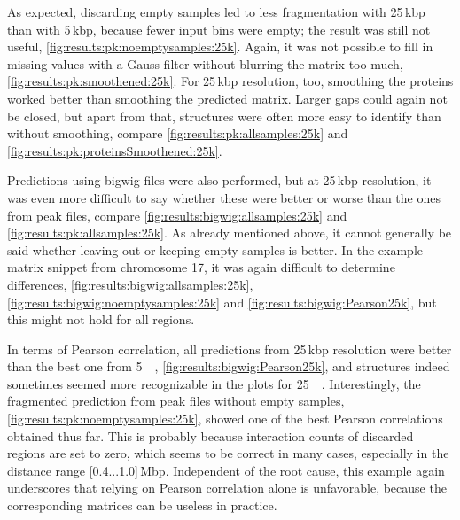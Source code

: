 As expected, discarding empty samples led to less fragmentation with 25\,kbp than with 5\,kbp,
because fewer input bins were empty; the result was still not useful, \autoref{fig:results:pk:noemptysamples:25k}.
Again, it was not possible to fill in missing values with a Gauss filter without blurring the
matrix too much, \autoref{fig:results:pk:smoothened:25k}.
For 25\,kbp resolution, too, smoothing the proteins worked better than smoothing the predicted matrix. 
Larger gaps could again not be closed, but apart from that, structures were often more easy to identify than 
without smoothing, compare \autoref{fig:results:pk:allsamples:25k} and \ref{fig:results:pk:proteinsSmoothened:25k}.

Predictions using bigwig files were also performed, 
but at 25\,kbp resolution, it was even more difficult to say whether these were better or worse than the ones from peak files,
compare \autoref{fig:results:bigwig:allsamples:25k} and \ref{fig:results:pk:allsamples:25k}.
As already mentioned above, it cannot generally be said whether leaving out or keeping empty samples is better.
In the example matrix snippet from chromosome 17, it was again difficult to determine differences, 
\autoref{fig:results:bigwig:allsamples:25k}, \ref{fig:results:bigwig:noemptysamples:25k} 
and \ref{fig:results:bigwig:Pearson25k}, but this might not hold for all regions.

In terms of Pearson correlation, all predictions from 25\,kbp resolution were better
than the best one from \SI{5}{\kilo\bp}, \autoref{fig:results:bigwig:Pearson25k}, and structures indeed sometimes seemed 
more recognizable in the plots for \SI{25}{\kilo\bp}. 
Interestingly, the fragmented prediction from peak files without empty samples, \autoref{fig:results:pk:noemptysamples:25k},
showed one of the best Pearson correlations obtained thus far.
This is probably because interaction counts of discarded regions are set to zero, 
which seems to be correct in many cases, especially in the distance range [0.4...1.0]\,Mbp.
Independent of the root cause, this example again underscores that relying on Pearson correlation alone is unfavorable,
because the corresponding matrices can be useless in practice.

